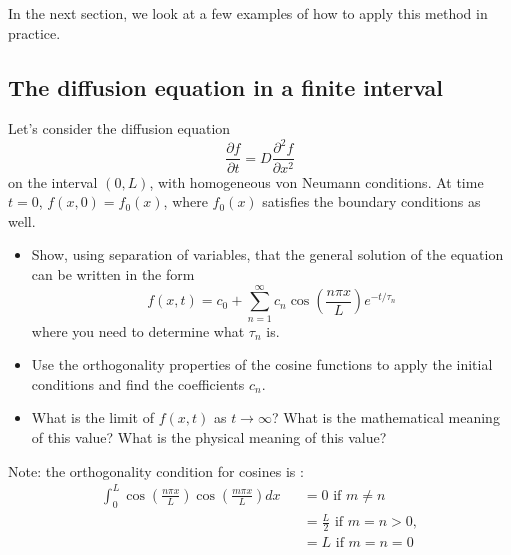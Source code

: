 In the next section, we look at a few examples of how to apply this method in practice. 

\subsection{The diffusion equation in a finite interval}

Let's consider the diffusion equation 
\begin{equation}
    \frac{\partial f}{\partial t} = D \frac{\partial^2 f}{\partial x^2}
    \label{eq:diffeq}
\end{equation}
on the interval $(0,L)$, with homogeneous von Neumann conditions. At time $t= 0$, $f(x,0) = f_0(x)$, where $f_0(x)$ satisfies the boundary conditions as well. 
\begin{itemize}
\item Show, using separation of variables, that the general solution of the equation can be written in the form
\begin{equation}
f(x,t) = c_0 + \sum_{n=1}^\infty c_n \cos\left( \frac{n\pi x}{L} \right) e^{-t / \tau_n}
\end{equation} 
where you need to determine what $\tau_n$ is. 
\item Use the orthogonality properties of the cosine functions to apply the initial conditions and find the coefficients $c_n$. 
\item What is the limit of $f(x,t)$ as $t \rightarrow \infty$? What is the mathematical meaning of this value? What is the physical meaning of this value?
\end{itemize}
Note: the orthogonality condition for cosines is : 
\begin{eqnarray}
    \int_0^L \cos \left( \frac{n\pi x}{L} \right)  \cos \left( \frac{m\pi x}{L} \right) dx && = 0 \mbox{ if  } m \neq n   \nonumber \\
   && = \frac{L}{2} \mbox{ if  } m = n > 0, \nonumber \\ && =  L \mbox{ if  } m = n = 0
\label{eq:cosineortho}
\end{eqnarray}\\
\\
